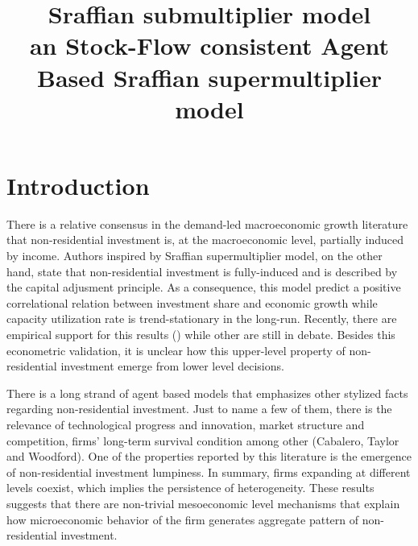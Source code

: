 \documentclass{SelfArx}
\date{}
\title{Sraffian submultiplier model\\\medskip
\large an Stock-Flow consistent Agent Based Sraffian supermultiplier model}
\begin{document}


\newcommand{\keywordname}{Keywords} %


\flushbottom %
\maketitle %
\thispagestyle{empty} %

\section{Introduction}
\label{sec:orge3b4b36}
There is a relative consensus in the demand-led macroeconomic growth literature that non-residential investment is, at the macroeconomic level, partially induced by income.
Authors inspired by Sraffian supermultiplier model, on the other hand, state that non-residential investment is fully-induced and is described by the capital adjusment principle.
As a consequence, this model predict a positive correlational relation between investment share and economic growth while capacity utilization rate is trend-stationary in the long-run.
Recently, there are empirical support for this results () while other are still in debate.
Besides this econometric validation, it is unclear how this upper-level property of non-residential investment emerge from lower level decisions.

There is a long strand of agent based models that emphasizes other stylized facts regarding non-residential investment.
Just to name a few of them, there is the relevance of technological progress and innovation, market structure and competition, firms' long-term survival condition among other (Cabalero, Taylor and Woodford).
One of the properties reported by this literature is the emergence of non-residential investment lumpiness.
In summary, firms expanding at different levels coexist, which implies the persistence of heterogeneity.
These results suggests that there are non-trivial mesoeconomic level mechanisms that explain how microeconomic behavior of the firm generates aggregate pattern of non-residential investment.
\end{document}
